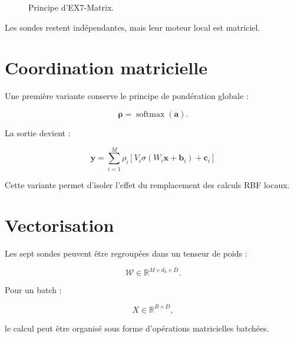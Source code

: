 \documentclass[11pt,a4paper]{report}
\newcommand{\R}{\mathbb{R}}
\newcommand{\softmax}{\operatorname{softmax}}
\newcommand{\vect}[1]{\bm{#1}}
\begin{document}
\begin{figure}[H]
\centering
{}
\caption{Principe d'EX7-Matrix.}
\end{figure}

Les sondes restent indépendantes, mais leur moteur local
est matriciel.

\section{Coordination matricielle}

Une première variante conserve le principe de pondération
globale :

\[
\vect{\rho}=\softmax(\vect{a}).
\]

La sortie devient :

\[
\boxed{
\vect{y}
=
\sum_{i=1}^{M}
\rho_i
\left[
V_i\sigma(W_i\vect{x}+\vect{b}_i)
+\vect{c}_i
\right]
}
\]

Cette variante permet d'isoler l'effet du remplacement
des calculs RBF locaux.

\section{Vectorisation}

Les sept sondes peuvent être regroupées dans un tenseur
de poids :

\[
\mathcal{W}
\in\R^{M\times d_h\times D}.
\]

Pour un batch :

\[
X\in\R^{B\times D},
\]

le calcul peut être organisé sous forme d'opérations
matricielles batchées.
\end{document}
